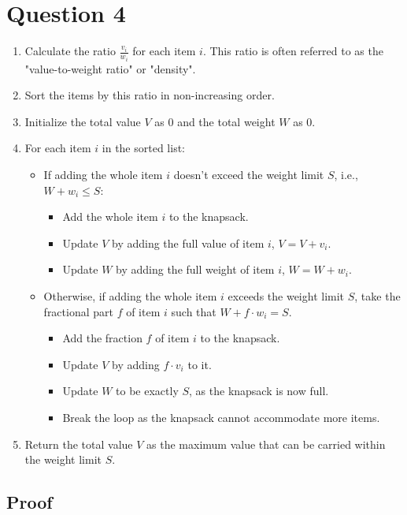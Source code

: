 \documentclass{article}
\begin{document}
\section{Question 4}
\begin{enumerate}
    \item Calculate the ratio \( \frac{v_i}{w_i} \) for each item \( i \). This ratio is often referred to as the "value-to-weight ratio" or "density".
    \item Sort the items by this ratio in non-increasing order.
    \item Initialize the total value \( V \) as 0 and the total weight \( W \) as 0.
    \item For each item \( i \) in the sorted list:
    \begin{itemize}
        \item If adding the whole item \( i \) doesn't exceed the weight limit \( S \), i.e., \( W + w_i \leq S \):
        \begin{itemize}
            \item Add the whole item \( i \) to the knapsack.
            \item Update \( V \) by adding the full value of item \( i \), \( V = V + v_i \).
            \item Update \( W \) by adding the full weight of item \( i \), \( W = W + w_i \).
        \end{itemize}
        \item Otherwise, if adding the whole item \( i \) exceeds the weight limit \( S \), take the fractional part \( f \) of item \( i \) such that \( W + f \cdot w_i = S \).
        \begin{itemize}
            \item Add the fraction \( f \) of item \( i \) to the knapsack.
            \item Update \( V \) by adding \( f \cdot v_i \) to it.
            \item Update \( W \) to be exactly \( S \), as the knapsack is now full.
            \item Break the loop as the knapsack cannot accommodate more items.
        \end{itemize}
    \end{itemize}
    \item Return the total value \( V \) as the maximum value that can be carried within the weight limit \( S \).
\end{enumerate}

\subsection{Proof}
\end{document}

